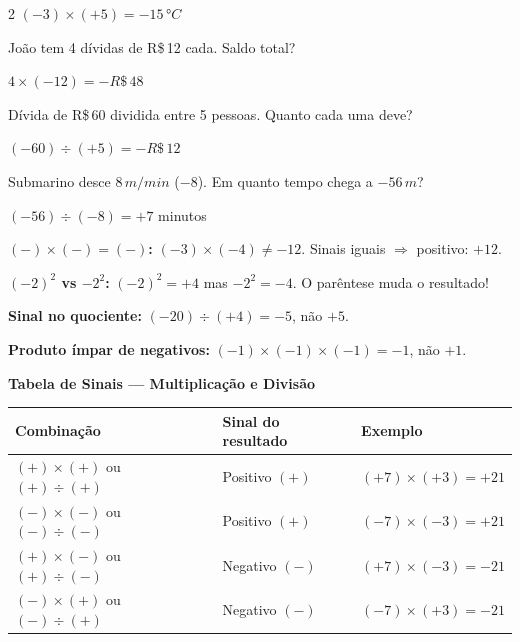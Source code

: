 \documentclass[12pt,twoside]{article}
\begin{document}
\begin{multicols}{2}
$(-3)\times(+5) = -15\,°C$ \checkmark


João tem 4 dívidas de R\$\,12 cada. Saldo total?

$4\times(-12) = -R\$\,48$ \checkmark


Dívida de R\$\,60 dividida entre 5 pessoas. Quanto cada uma deve?

$(-60)\div(+5) = -R\$\,12$ \checkmark


Submarino desce $8\,m/min$ ($-8$). Em quanto tempo chega a $-56\,m$?

$(-56)\div(-8) = +7$ minutos \checkmark


\textbf{$(-)\times(-) = (-)$:} $(-3)\times(-4) \neq -12$. Sinais iguais $\Rightarrow$ positivo: $+12$.

\textbf{$(-2)^2$ vs $-2^2$:} $(-2)^2 = +4$ mas $-2^2 = -4$. O parêntese muda o resultado!

\textbf{Sinal no quociente:} $(-20)\div(+4) = -5$, não $+5$.

\textbf{Produto ímpar de negativos:} $(-1)\times(-1)\times(-1) = -1$, não $+1$.

\end{multicols}

\vspace{0.5cm}

\begin{center}
    \textbf{\Large Tabela de Sinais — Multiplicação e Divisão}
\end{center}

\setlength{\tabcolsep}{14pt}
\begin{tabular}{lll}
\hline
\textbf{Combinação} & \textbf{Sinal do resultado} & \textbf{Exemplo} \\
\hline
$(+)\times(+)$ ou $(+)\div(+)$ & Positivo $(+)$ & $(+7)\times(+3)=+21$ \\
$(-)\times(-)$ ou $(-)\div(-)$ & Positivo $(+)$ & $(-7)\times(-3)=+21$ \\
$(+)\times(-)$ ou $(+)\div(-)$ & Negativo $(-)$ & $(+7)\times(-3)=-21$ \\
$(-)\times(+)$ ou $(-)\div(+)$ & Negativo $(-)$ & $(-7)\times(+3)=-21$ \\
\hline
\end{tabular}


\end{document}
